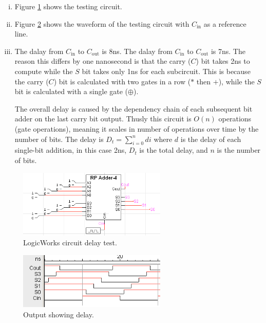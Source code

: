 \documentclass[11pt]{article}
\begin{document}
\begin{enumerate}[(a)]
{		\begin{enumerate}[i.]
			\item{
				Figure \ref{fig:2cc} shows the testing circuit.
			}
			\item {
				Figure \ref{fig:2ct} shows the waveform of the testing circuit with $C_{\text{in}}$ as a reference line.
			}
			\item{
				The dalay from $C_{\text{in}}$ to $C_{\text{out}}$ is 8ns. The dalay from $C_{\text{in}}$ to $C_{\text{out}}$ is 7ns. The reason this differs by one nanosecond is that the carry ($C$) bit takes 2ns to compute while the $S$ bit takes only 1ns for each subcircuit. This is because the carry ($C$) bit is calculated with two gates in a row ($*$ then $+$), while the $S$ bit is calculated with a single gate ($\oplus$).

				The overall delay is caused by the dependency chain of each subsequent bit adder on the last carry bit output. Thusly this circuit is $O(n)$ operations (gate operations), meaning it scales in number of operations over time by the number of bits. The delay is $D_t = \sum\limits_{i=0}^n di$ where $d$ is the delay of each single-bit addition, in this case 2ns, $D_t$ is the total delay, and $n$ is the number of bits.
			}
		\end{enumerate}

		\begin{figure}[h]
			\centering
			\includegraphics[width=200pt]{2pct}
			\caption{\label{fig:2cc} LogicWorks circuit delay test.}
		\end{figure}

		\begin{figure}[h]
			\centering
			\includegraphics[width=200pt]{2ptt}
			\caption{\label{fig:2ct} Output showing delay.}
		\end{figure}
	}
\end{enumerate}
\end{document}
